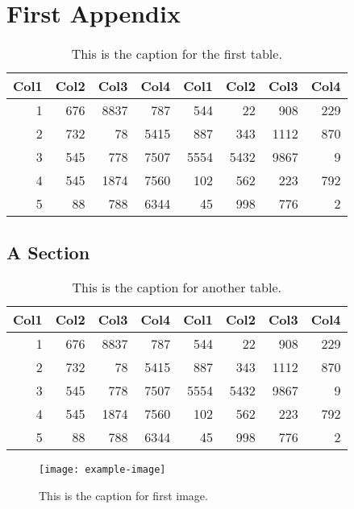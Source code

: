 \chapter{First Appendix}
    \lipsum[1]
    \begin{table}
        \centering
        \begin{tabular}{r r r r r r r r}
             Col1 & Col2 & Col3 & Col4 & Col1 & Col2 & Col3 & Col4 \\
             \hline
             1    & 676  & 8837 & 787  & 544  & 22   & 908  & 229  \\
             2    & 732  & 78   & 5415 & 887  & 343  & 1112 & 870  \\
             3    & 545  & 778  & 7507 & 5554 & 5432 & 9867 & 9    \\
             4    & 545  & 1874 & 7560 & 102  & 562  & 223  & 792  \\
             5    & 88   & 788  & 6344 & 45   & 998  & 776  & 2    \\
             \hline
        \end{tabular}
        \captionsetup{width=3.9in}
        \caption{This is the caption for the first table.}
    \end{table}
    \lipsum[2]

\section{A Section}
    \lipsum[3]
    \begin{table}
        \centering
        \begin{tabular}{r r r r r r r r}
             Col1 & Col2 & Col3 & Col4 & Col1 & Col2 & Col3 & Col4 \\
             \hline
             1    & 676  & 8837 & 787  & 544  & 22   & 908  & 229  \\
             2    & 732  & 78   & 5415 & 887  & 343  & 1112 & 870  \\
             3    & 545  & 778  & 7507 & 5554 & 5432 & 9867 & 9    \\
             4    & 545  & 1874 & 7560 & 102  & 562  & 223  & 792  \\
             5    & 88   & 788  & 6344 & 45   & 998  & 776  & 2    \\
             \hline
        \end{tabular}
        \captionsetup{width=3.9in}
        \caption{This is the caption for another table.}
    \end{table}
    \lipsum[4-5]
    \begin{figure}
        \centering
        \texttt{[image: example-image]}
        \captionsetup{width=3.5in}
        \caption{This is the caption for first image.}
    \end{figure}

